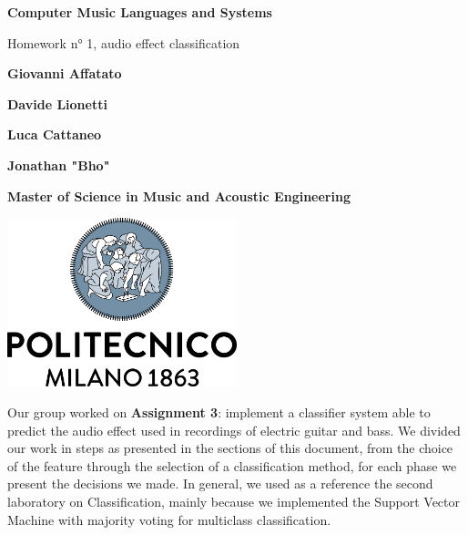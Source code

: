 \documentclass[a4paper,12pt]{report}
\begin{document}
\begin{titlepage}
\begin{center}
    \vspace*{1cm}
    
    \Huge
    \textbf{Computer Music Languages and Systems}
    
    \vspace{0.5cm}
    \LARGE
    Homework n° 1, audio effect classification

    \vspace{1 cm}
    
    \textbf{Giovanni Affatato}
    
    \vspace{0.5cm}
    
    \textbf{Davide Lionetti}
     
    \vspace{0.5cm}
    
    \textbf{Luca Cattaneo}
     
    
    \vspace{0.5cm}
    
    \textbf{Jonathan "Bho"}
    
    \vspace{0.5cm}
    
    \vfill
    
   
    \date{April 2021}
    \vspace{0.3cm}
    \textbf{Master of Science in Music and Acoustic Engineering}
    
    \vspace{0.8cm}
    
    \includegraphics[width=0.5\textwidth]{logo_positivo.png}
    
\end{center}
\end{titlepage}


\abstract{}
Our group worked on \textbf{Assignment 3}: implement a 			  	classifier system able to predict the audio effect used in 			 	recordings of electric guitar and bass. We divided our work in 		 	steps as presented in the sections of this document, from the  	      	choice of the feature through the selection of a classification 		method, for each phase we present the decisions we made. In 			general, we used as a reference the second laboratory on 				Classification, mainly because we implemented the Support Vector 	Machine with majority voting for multiclass classification.
\endabstract{}
\end{document}
